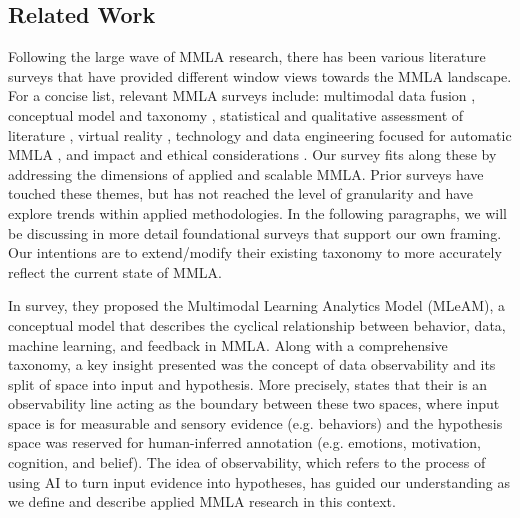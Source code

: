 \documentclass[manuscript,screen,review]{acmart}
\begin{document}
\subsection{Related Work} \label{subsec:related_work}

Following the large wave of MMLA research, there has been various literature surveys that have provided different window views towards the MMLA landscape. For a concise list, relevant MMLA surveys include: multimodal data fusion \cite{chango_review_nodate}, conceptual model and taxonomy \cite{di_mitri_signals_2018}, statistical and qualitative assessment of literature \cite{sharma_multimodal_2020, qushem_trends_nodate}, virtual reality \cite{philippe_multimodal_2020}, technology and data engineering focused for automatic MMLA \cite{chua_technologies_2019}, and impact and ethical considerations \cite{alwahaby_evidence_2021}. Our survey fits along these by addressing the dimensions of applied and scalable MMLA. Prior surveys have touched these themes, but has not reached the level of granularity and have explore trends within applied methodologies. In the following paragraphs, we will be discussing in more detail foundational surveys that support our own framing. Our intentions are to extend/modify their existing taxonomy to more accurately reflect the current state of MMLA. 

In \citet{di_mitri_signals_2018} survey, they proposed the Multimodal Learning Analytics Model (MLeAM), a conceptual model that describes the cyclical relationship between behavior, data, machine learning, and feedback in MMLA. Along with a comprehensive taxonomy, a key insight presented was the concept of data observability and its split of space into input and hypothesis. More precisely, \citet{di_mitri_signals_2018} states that their is an observability line acting as the boundary between these two spaces, where input space is for measurable and sensory evidence (e.g. behaviors) and the hypothesis space was reserved for human-inferred annotation (e.g. emotions, motivation, cognition, and belief). The idea of observability, which refers to the process of using AI to turn input evidence into hypotheses, has guided our understanding as we define and describe applied MMLA research in this context.
\end{document}
